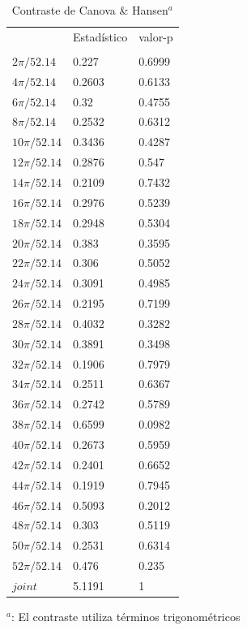 \documentclass[12pt, twoside]{book}\usepackage[]{graphicx}\usepackage[]{color}
\numberwithin{equation}{section}
\numberwithin{theorem}{section}
\numberwithin{teorema}{section}
\numberwithin{defi}{section}
\numberwithin{prop}{section}
\numberwithin{defi}{section}
\theoremstyle{plain}
\begin{document}
\begin{table}[H]
\centering
\caption{Contraste de Canova \& Hansen$^{a}$}
\begin{threeparttable}
\begin{tabular}{@{}lll@{}}
\toprule 
	&	Estadístico	&	valor-p	\\
\cmidrule(l){2-2} \cmidrule(l){3-3} \\	
$	2\pi/52.14	$	& 	0.227	& 	0.6999	\\
$	4\pi/52.14	$	&	0.2603	&	0.6133	\\
$	6\pi/52.14	$	& 	0.32	& 	0.4755	\\
$	8\pi/52.14	$	&	0.2532	&	0.6312	\\
$	10\pi/52.14	$	& 	0.3436	& 	0.4287	\\
$	12\pi/52.14	$	&	0.2876	&	0.547	\\
$	14\pi/52.14	$	& 	0.2109	& 	0.7432	\\
$	16\pi/52.14	$	&	0.2976	&	0.5239	\\
$	18\pi/52.14	$	& 	0.2948	& 	0.5304	\\
$	20\pi/52.14	$	&	0.383	&	0.3595	\\
$	22\pi/52.14	$	& 	0.306	& 	0.5052	\\
$	24\pi/52.14	$	&	0.3091	&	0.4985	\\
$	26\pi/52.14	$	& 	0.2195	& 	0.7199	\\
$	28\pi/52.14	$	&	0.4032	&	0.3282	\\
$	30\pi/52.14	$	& 	0.3891	& 	0.3498	\\
$	32\pi/52.14	$	&	0.1906	&	0.7979	\\
$	34\pi/52.14	$	& 	0.2511	& 	0.6367	\\
$	36\pi/52.14	$	&	0.2742	&	0.5789	\\
$	38\pi/52.14	$	& 	0.6599	& 	0.0982	\\
$	40\pi/52.14	$	&	0.2673	&	0.5959	\\
$	42\pi/52.14	$	& 	0.2401	& 	0.6652	\\
$	44\pi/52.14	$	&	0.1919	&	0.7945	\\
$	46\pi/52.14	$	& 	0.5093	& 	0.2012	\\
$	48\pi/52.14	$	&	0.303	&	0.5119	\\
$	50\pi/52.14	$	& 	0.2531	& 	0.6314	\\
$	52\pi/52.14	$	&	0.476	&	0.235	\\
$	joint	$	& 	5.1191	& 	1	\\
\bottomrule 
\end{tabular}
\begin{tablenotes}
\small
\item $^{a}$: El contraste utiliza términos trigonométricos
\end{tablenotes}
\end{threeparttable}
\end{table}
\end{document}
